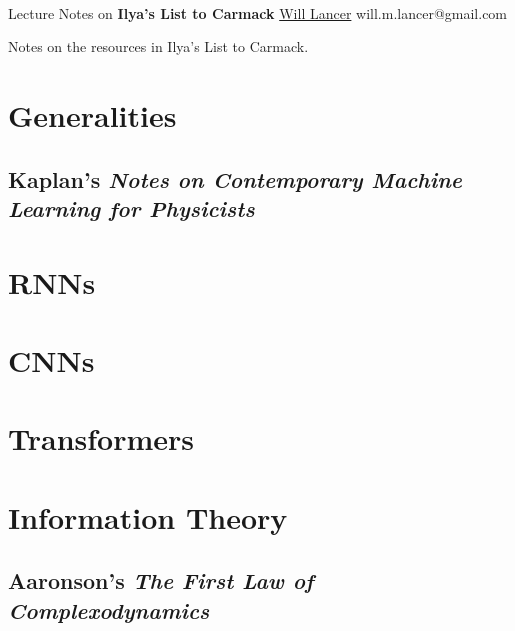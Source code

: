 \documentclass[11pt]{article}
\begin{document}
\thispagestyle{empty}
\bigskip \
\vspace{0.1cm}

\begin{center}
{\fontsize{22}{22} \selectfont Lecture Notes on}
\vskip 16pt
{\fontsize{36}{36} \selectfont \bf \sffamily Ilya's List to Carmack}
\vskip 24pt
{\fontsize{18}{18} \selectfont \rmfamily \href{https://will-lancer.github.io}{Will Lancer}}
\vskip 6pt
{\fontsize{14}{14} \selectfont \ttfamily will.m.lancer@gmail.com}
\vskip 24pt
\end{center}

{\parindent0pt \baselineskip=15.5pt}
\noin
Notes on the resources in Ilya's List to Carmack.

\newpage
\microtoc
\newpage

\section{Generalities}

\subsection{Kaplan's \emph{Notes on Contemporary Machine Learning for Physicists}}

\section{RNNs}

\section{CNNs}

\section{Transformers}

\section{Information Theory}

\subsection{Aaronson's \emph{The First Law of Complexodynamics}}

\end{document}
